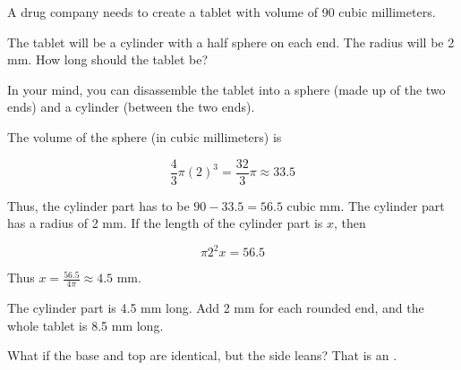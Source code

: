 \begin{Exercise}[title={Tablet}, label=tablet]

  A drug company needs to create a tablet with volume of 90 cubic millimeters.

  The tablet will be a cylinder with a half sphere on each end. The radius
  will be 2 mm. How long should the tablet be?

  \vspace{2mm}
  
  

\end{Exercise}
\begin{Answer}[ref=tablet]
  In your mind, you can disassemble the tablet into a sphere (made up of
  the two ends) and a cylinder (between the two ends).
  
  The volume of the sphere (in cubic millimeters) is

  $$\frac{4}{3}\pi (2)^3 =\frac{32}{3}\pi \approx 33.5$$

  Thus, the cylinder part has to be $90 - 33.5 = 56.5$ cubic mm. The
  cylinder part has a radius of 2 mm. If the length of the cylinder
  part is $x$, then

  $$\pi 2^2 x = 56.5$$

  Thus $x = \frac{56.5}{4 \pi} \approx 4.5$ mm.

  The cylinder part is 4.5 mm long. Add 2 mm for each rounded end, and the
  whole tablet is 8.5 mm long.
  
\end{Answer}

What if the base and top are identical, but the side leans? That is an
.

